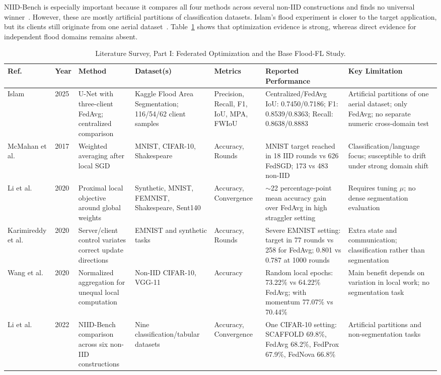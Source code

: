 \documentclass[conference]{IEEEtran}
\begin{document}
NIID-Bench is especially important because it compares all four methods across several non-IID constructions and finds no universal winner~\cite{li2022federated}. However, these are mostly artificial partitions of classification datasets. Islam's flood experiment is closer to the target application, but its clients still originate from one aerial dataset~\cite{islam2025robust}. Table~\ref{tab:lit_opt} shows that optimization evidence is strong, whereas direct evidence for independent flood domains remains absent.

\begin{table}[t]
\centering
\caption{Literature Survey, Part I: Federated Optimization and the Base Flood-FL Study.}
\label{tab:lit_opt}
\small
\begin{tabularx}{\textwidth}{p{1.8cm}p{0.8cm}p{3.2cm}p{2.8cm}p{2.2cm}p{3.2cm}X}
\toprule
\textbf{Ref.} & \textbf{Year} & \textbf{Method} & \textbf{Dataset(s)} & \textbf{Metrics} & \textbf{Reported Performance} & \textbf{Key Limitation} \\
\midrule
Islam~\cite{islam2025robust} & 2025 & U-Net with three-client FedAvg; centralized comparison & Kaggle Flood Area Segmentation; 116/54/62 client samples & Precision, Recall, F1, IoU, MPA, FWIoU & Centralized/FedAvg IoU: 0.7450/0.7186; F1: 0.8539/0.8363; Recall: 0.8638/0.8883 & Artificial partitions of one aerial dataset; only FedAvg; no separate numeric cross-domain test \\
McMahan et al.~\cite{mcmahan2017communication} & 2017 & Weighted averaging after local SGD & MNIST, CIFAR-10, Shakespeare & Accuracy, Rounds & MNIST target reached in 18 IID rounds vs 626 FedSGD; 173 vs 483 non-IID & Classification/language focus; susceptible to drift under strong domain shift \\
Li et al.~\cite{li2020federated} & 2020 & Proximal local objective around global weights & Synthetic, MNIST, FEMNIST, Shakespeare, Sent140 & Accuracy, Convergence & $\sim$22 percentage-point mean accuracy gain over FedAvg in high straggler setting & Requires tuning $\mu$; no dense segmentation evaluation \\
Karimireddy et al.~\cite{karimireddy2020scaffold} & 2020 & Server/client control variates correct update directions & EMNIST and synthetic tasks & Accuracy, Rounds & Severe EMNIST setting: target in 77 rounds vs 258 for FedAvg; 0.801 vs 0.787 at 1000 rounds & Extra state and communication; classification rather than segmentation \\
Wang et al.~\cite{wang2020tackling} & 2020 & Normalized aggregation for unequal local computation & Non-IID CIFAR-10, VGG-11 & Accuracy & Random local epochs: 73.22\% vs 64.22\% FedAvg; with momentum 77.07\% vs 70.44\% & Main benefit depends on variation in local work; no segmentation task \\
Li et al.~\cite{li2022federated} & 2022 & NIID-Bench comparison across six non-IID constructions & Nine classification/tabular datasets & Accuracy, Convergence & One CIFAR-10 setting: SCAFFOLD 69.8\%, FedAvg 68.2\%, FedProx 67.9\%, FedNova 66.8\% & Artificial partitions and non-segmentation tasks \\
\bottomrule
\end{tabularx}
\end{table}
\end{document}
